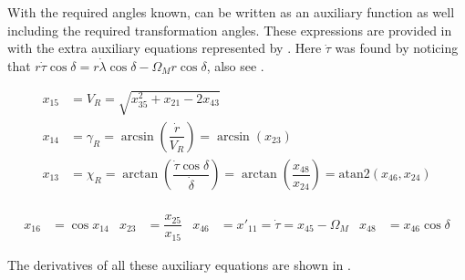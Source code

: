 With the required angles known,  can be written as an auxiliary function as well including the required transformation angles. These expressions are provided in  with the extra auxiliary equations represented by . Here $\dot{\tau}$ was found by noticing that $r\dot{\tau}\cos \delta=r\dot{\lambda}\cos \delta-\Omega_{M}r\cos \delta$, also see .

 \begin{equation} \label{eq:rotTransAnglAux}
\begin{split}
x_{15} &= V_{R} = \sqrt{x_{35}^{2}+x_{21}-2x_{43}}\\
x_{14} &= \gamma_{R} = \arcsin\left(\dfrac{\dot{r}}{V_{R}}\right) = \arcsin\left(x_{23}\right)\\
x_{13} &= \chi_{R} = \arctan\left(\dfrac{\dot{\tau}\cos \delta}{\dot{\delta}}\right)=\arctan\left(\dfrac{x_{48}}{x_{24}}\right)=\text{atan2}\left(x_{46},x_{24}\right)\\
\end{split}
\end{equation} 

 
 \begin{align} \label{eq:rotExtraTransAnglAux}
x_{16} &= \cos x_{14}
&
x_{23} &= \dfrac{x_{25}}{x_{15}}
&
x_{46} &= x'_{11} = \dot{\tau} = x_{45}-\Omega_{M}
&
x_{48} &= x_{46}\cos \delta
\end{align}  

The derivatives of all these auxiliary equations are shown in .

